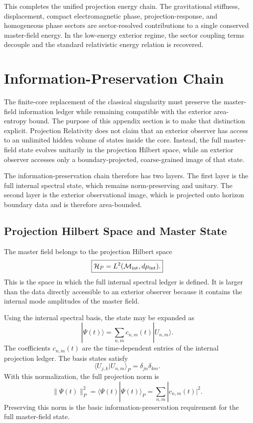 \documentclass[11pt]{article}
\begin{document}
This completes the unified projection energy chain. The gravitational stiffness,
displacement, compact electromagnetic phase, projection-response, and homogeneous
phase sectors are sector-resolved contributions to a single conserved
master-field energy. In the low-energy exterior regime, the sector coupling terms
decouple and the standard relativistic energy relation is recovered.

\section{Information-Preservation Chain}
\label{sec:information_preservation_chain}

The finite-core replacement of the classical singularity must preserve the
master-field information ledger while remaining compatible with the exterior
area-entropy bound. The purpose of this appendix section is to make that
distinction explicit. Projection Relativity does not claim that an exterior
observer has access to an unlimited hidden volume of states inside the core.
Instead, the full master-field state evolves unitarily in the projection Hilbert
space, while an exterior observer accesses only a boundary-projected,
coarse-grained image of that state.

The information-preservation chain therefore has two layers. The first layer is
the full internal spectral state, which remains norm-preserving and unitary. The
second layer is the exterior observational image, which is projected onto
horizon boundary data and is therefore area-bounded.

\subsection{Projection Hilbert Space and Master State}

The master field belongs to the projection Hilbert space
\begin{equation}
\boxed{
\mathcal H_P
=
L^2(\mathcal M_{\rm int},d\mu_{\rm int}).
}
\end{equation}
This is the space in which the full internal spectral ledger is defined. It is
larger than the data directly accessible to an exterior observer because it
contains the internal mode amplitudes of the master field.

Using the internal spectral basis, the state may be expanded as
\begin{equation}
\boxed{
|\Psi(t)\rangle
=
\sum_{n,m}
c_{n,m}(t)|U_{n,m}\rangle .
}
\end{equation}
The coefficients \(c_{n,m}(t)\) are the time-dependent entries of the internal
projection ledger. The basis states satisfy
\begin{equation}
\boxed{
\langle U_{j,k}|U_{n,m}\rangle_P
=
\delta_{jn}\delta_{km}.
}
\end{equation}
With this normalization, the full projection norm is
\begin{equation}
\boxed{
\|\Psi(t)\|_P^2
=
\langle\Psi(t)|\Psi(t)\rangle_P
=
\sum_{n,m}
|c_{n,m}(t)|^2.
}
\end{equation}
Preserving this norm is the basic information-preservation requirement for the
full master-field state.
\end{document}

